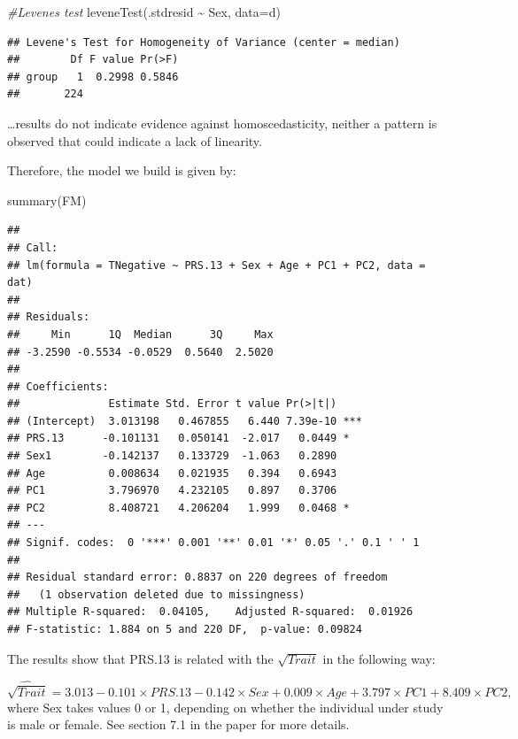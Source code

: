 \documentclass[
]{article}
\newenvironment{Shaded}{\begin{snugshade}}{\end{snugshade}}
\newcommand{\AttributeTok}[1]{\textcolor[rgb]{0.77,0.63,0.00}{#1}}
\newcommand{\CommentTok}[1]{\textcolor[rgb]{0.56,0.35,0.01}{\textit{#1}}}
\newcommand{\FunctionTok}[1]{\textcolor[rgb]{0.00,0.00,0.00}{#1}}
\newcommand{\NormalTok}[1]{#1}
\newcommand{\SpecialCharTok}[1]{\textcolor[rgb]{0.00,0.00,0.00}{#1}}
\begin{document}
\begin{Shaded}
\begin{Highlighting}[]
\CommentTok{\#Levene\textquotesingle{}s test}
\FunctionTok{leveneTest}\NormalTok{(.stdresid }\SpecialCharTok{\textasciitilde{}}\NormalTok{ Sex, }\AttributeTok{data=}\NormalTok{d)}
\end{Highlighting}
\end{Shaded}

\begin{verbatim}
## Levene's Test for Homogeneity of Variance (center = median)
##        Df F value Pr(>F)
## group   1  0.2998 0.5846
##       224
\end{verbatim}

\ldots results do not indicate evidence against homoscedasticity,
neither a pattern is observed that could indicate a lack of linearity.

Therefore, the model we build is given by:

\begin{Shaded}
\begin{Highlighting}[]
\FunctionTok{summary}\NormalTok{(FM)}
\end{Highlighting}
\end{Shaded}

\begin{verbatim}
## 
## Call:
## lm(formula = TNegative ~ PRS.13 + Sex + Age + PC1 + PC2, data = dat)
## 
## Residuals:
##     Min      1Q  Median      3Q     Max 
## -3.2590 -0.5534 -0.0529  0.5640  2.5020 
## 
## Coefficients:
##              Estimate Std. Error t value Pr(>|t|)    
## (Intercept)  3.013198   0.467855   6.440 7.39e-10 ***
## PRS.13      -0.101131   0.050141  -2.017   0.0449 *  
## Sex1        -0.142137   0.133729  -1.063   0.2890    
## Age          0.008634   0.021935   0.394   0.6943    
## PC1          3.796970   4.232105   0.897   0.3706    
## PC2          8.408721   4.206204   1.999   0.0468 *  
## ---
## Signif. codes:  0 '***' 0.001 '**' 0.01 '*' 0.05 '.' 0.1 ' ' 1
## 
## Residual standard error: 0.8837 on 220 degrees of freedom
##   (1 observation deleted due to missingness)
## Multiple R-squared:  0.04105,    Adjusted R-squared:  0.01926 
## F-statistic: 1.884 on 5 and 220 DF,  p-value: 0.09824
\end{verbatim}

The results show that PRS.13 is related with the \(\sqrt{Trait}\) in the
following way:

\[\widehat{\sqrt{Trait}} = 3.013 - 0.101\times PRS.13 - 0.142\times Sex + 0.009\times Age + 3.797\times PC1 + 8.409\times PC2,\]
where Sex takes values 0 or 1, depending on whether the individual under
study is male or female. See section 7.1 in the paper for more details.
\end{document}
